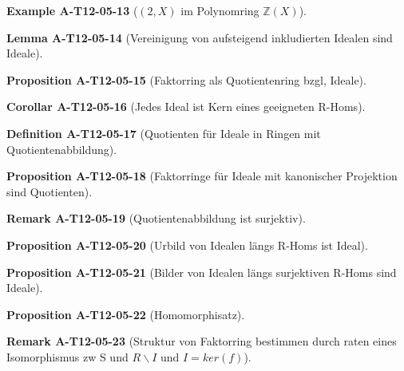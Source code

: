 \documentclass[10pt, letterpaper]{article}
\newcommand{\Z}{\mathbb{Z}}
\newcommand{\CustomHeading}[3]{%
  \par\medskip\noindent%
  \textbf{#1 #2} \textnormal{(#3)}.\enskip%
}
\newenvironment{DEF}[2]{\CustomHeading{Definition}{#1}{#2}}{}
\newenvironment{PROP}[2]{\CustomHeading{Proposition}{#1}{#2}}{}
\newenvironment{LEM}[2]{\CustomHeading{Lemma}{#1}{#2}}{}
\newenvironment{KORO}[2]{\CustomHeading{Corollar}{#1}{#2}}{}
\newenvironment{REM}[2]{\CustomHeading{Remark}{#1}{#2}}{}
\newenvironment{EXA}[2]{\CustomHeading{Example}{#1}{#2}}{}
\begin{document}
\begin{EXA}{A-T12-05-13}{$(2,X)$ im Polynomring $\Z(X)$}
\end{EXA}

\begin{LEM}{A-T12-05-14}{Vereinigung von aufsteigend inkludierten Idealen sind Ideale}
\end{LEM}

\begin{PROP}{A-T12-05-15}{Faktorring als Quotientenring bzgl, Ideale}
\end{PROP}

\begin{KORO}{A-T12-05-16}{Jedes Ideal ist Kern eines geeigneten R-Homs}
\end{KORO}

\begin{DEF}{A-T12-05-17}{Quotienten für Ideale in Ringen mit Quotientenabbildung}
\end{DEF}

\begin{PROP}{A-T12-05-18}{Faktorringe für Ideale mit kanonischer Projektion sind Quotienten}
\end{PROP}

\begin{REM}{A-T12-05-19}{Quotientenabbildung ist surjektiv}
\end{REM}

\begin{PROP}{A-T12-05-20}{Urbild von Idealen längs R-Homs ist Ideal}
\end{PROP}

\begin{PROP}{A-T12-05-21}{Bilder von Idealen längs surjektiven R-Homs sind Ideale}
\end{PROP}

\begin{PROP}{A-T12-05-22}{Homomorphisatz}
\end{PROP}

\begin{REM}{A-T12-05-23}{Struktur von Faktorring bestimmen durch raten eines Isomorphismus zw S und $R\backslash I$ und $I=ker(f)$}
\end{REM}
\end{document}
